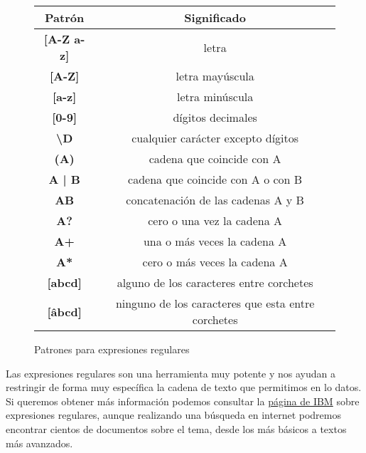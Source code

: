 \begin{itemize}
        \begin{figure}[ht]

        \vspace{3ex}
        \centering

        \setlength{\tabcolsep}{10pt}
        \renewcommand{\arraystretch}{1.4}

        \begin{tabular}{| c | c |}
            \hline
            \textbf{Patrón}  & \textbf{Significado}  \\ \hline
            \centering \textbf{[A-Z a-z]} &  letra  \\ \hline
            \centering \textbf{[A-Z]} &  letra mayúscula  \\ \hline
            \centering \textbf{[a-z]} &  letra minúscula  \\ \hline
            \centering \textbf{[0-9]} &  dígitos decimales  \\ \hline
            \centering \textbf{\textbackslash D} &  cualquier carácter excepto dígitos  \\ \hline
            \centering \textbf{(A)} &  cadena que coincide con A  \\ \hline
            \centering \textbf{A | B} &  cadena que coincide con A o con B  \\ \hline
            \centering \textbf{AB} &  concatenación de las cadenas A y B  \\ \hline
            \centering \textbf{A?} & cero o una vez la cadena A  \\ \hline
            \centering \textbf{A+} & una o más veces la cadena A  \\ \hline
            \centering \textbf{A*} & cero o más veces la cadena A  \\ \hline
            \centering \textbf{[abcd]} & alguno de los caracteres entre corchetes  \\ \hline
            \centering \textbf{[\^abcd]} & ninguno de los caracteres que esta entre corchetes  \\             \hline
        \end{tabular}
        \caption{Patrones para expresiones regulares}
    \end{figure}

    Las expresiones regulares son una herramienta muy potente y nos ayudan a restringir de forma muy específica la cadena de texto que permitimos en lo datos. Si queremos obtener más información podemos consultar la \href{https://www.ibm.com/docs/en/integration-bus/10.0?topic=elements-message-sets-regular-expression-syntax}{página de IBM} sobre expresiones regulares, aunque realizando una búsqueda en internet podremos encontrar cientos de documentos sobre el tema, desde los más básicos a textos más avanzados.


\end{itemize}
